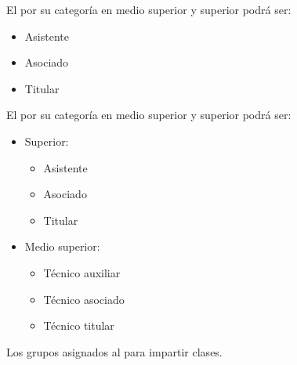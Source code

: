 \begin{bGlosario}
	  El  por su categoría en medio superior y superior podrá ser:
	 \begin{itemize}
	 	\item Asistente
	 	\item Asociado 
	 	\item Titular 
	 \end{itemize}
	 
	  El  por su categoría en medio superior y superior podrá ser:
	 
	 \begin{itemize}
	 	\item Superior:
	 	\begin{itemize}
	 		\item Asistente
	 		\item Asociado
	 		\item Titular
	 	\end{itemize}	
	 	
	 	\item Medio superior:
	 	\begin{itemize}
	 		\item Técnico auxiliar
	 		\item Técnico asociado
	 		\item Técnico titular
	 	\end{itemize}
	 \end{itemize}
	 
	  Los grupos asignados al  para impartir clases.
	 

\end{bGlosario}
